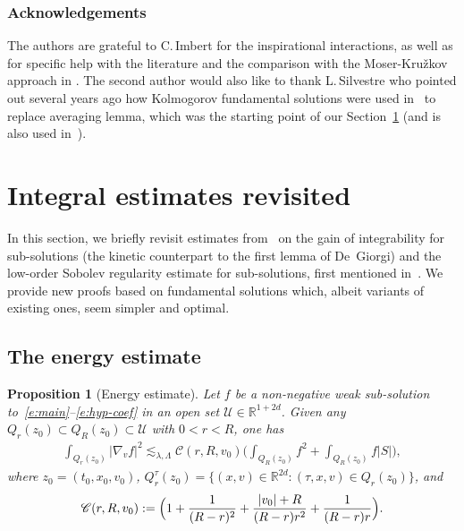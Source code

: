 \documentclass[11pt]{article}
\newcommand{\Subsection}{\subsection}
\numberwithin{equation}{section}\let\oldbigcup\bigcup
\let\mathcal\mathscr
\newtheorem{proposition}[theorem]{Proposition}
\theoremstyle{definition}
\theoremstyle{remark}
\newcommand\R{{\mathbb R}}
\newcommand{\cC}{\mathcal C}
\newcommand{\cU}{\mathcal{U}}
\begin{document}
\subsubsection*{Acknowledgements} The authors are grateful to
C.\,Imbert for the inspirational interactions, as well as for
specific help with the literature and the comparison with the
Moser-Kru\v{z}kov approach in \cite{Guerand-Imbert}. The second
author would also like to thank L.\,Silvestre who pointed out
several years ago how Kolmogorov fundamental solutions were used
in~\cite{pp} to replace averaging lemma, which was the starting
point of our Section~\ref{sec:int} (and is also used
in~\cite{MR4049224}).


\section{Integral estimates revisited}
\label{sec:int}

In this section, we briefly revisit estimates from~\cite{pp,gimv}
on the gain of inte\-grability for sub-solutions (the kinetic
counterpart to the first lemma of De~Giorgi) and the low-order
Sobolev regularity estimate for sub-solutions, first mentioned
in~\cite{gimv}. We provide new proofs based on fundamental
solutions which, albeit variants of existing ones, seem simpler
and optimal.

\Subsection{The energy estimate}

\begin{proposition}[Energy estimate]
\label{prop:EE}
Let $f$ be a non-negative weak sub-solution
to~\eqref{e:main}--\eqref{e:hyp-coef} in an open set
$\cU \in \R^{1+2d}$. Given any
$Q_r(z_0) \subset Q_R(z_0) \subset \cU$ with $0<r<R$, one has
\begin{align*}
\int_{Q_r(z_0)} |\nabla_v f|^2
\lesssim_{\lambda,\Lambda} \cC(r,R,v_0) \biggl(
\int_{Q_R(z_0)} f^2 + \int_{Q_R(z_0)} f |S| \biggr),
\end{align*}
where $z_0=(t_0,x_0,v_0)$,
$Q_r^\tau (z_0) = \{(x,v)\in\R^{2d} :(\tau,x,v)\in
Q_r(z_0) \} $, and
\begin{equation}
\label{eq:C}
\cC(r,R,v_0) := \Bigl( 1 + \frac{1}{(R-r)^2} +
\frac{|v_0|+R}{(R-r)r^2} +\frac{1}{(R-r)r} \Bigr).
\end{equation}
\end{proposition}
\end{document}
